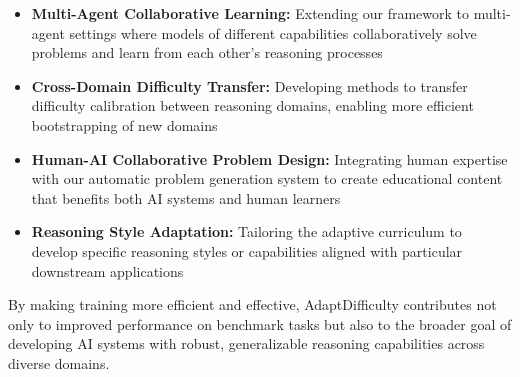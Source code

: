 \begin{itemize}
    \item \textbf{Multi-Agent Collaborative Learning:} Extending our framework to multi-agent settings where models of different capabilities collaboratively solve problems and learn from each other's reasoning processes
    \item \textbf{Cross-Domain Difficulty Transfer:} Developing methods to transfer difficulty calibration between reasoning domains, enabling more efficient bootstrapping of new domains
    \item \textbf{Human-AI Collaborative Problem Design:} Integrating human expertise with our automatic problem generation system to create educational content that benefits both AI systems and human learners
    \item \textbf{Reasoning Style Adaptation:} Tailoring the adaptive curriculum to develop specific reasoning styles or capabilities aligned with particular downstream applications
\end{itemize}

By making training more efficient and effective, AdaptDifficulty contributes not only to improved performance on benchmark tasks but also to the broader goal of developing AI systems with robust, generalizable reasoning capabilities across diverse domains.